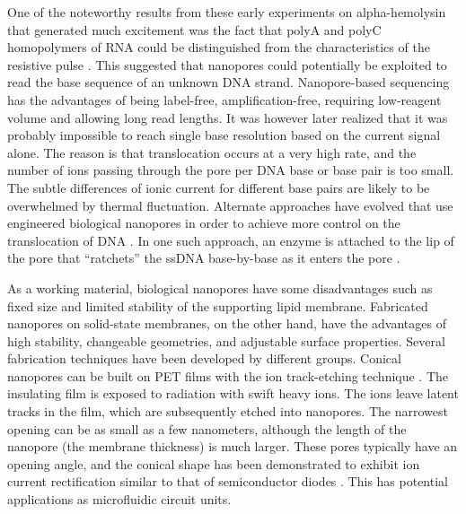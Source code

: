 One of the noteworthy results from these early experiments on alpha-hemolysin that generated much excitement was the fact that polyA and polyC homopolymers of RNA could be distinguished from the characteristics of the resistive pulse \cite{Akeson1999,Meller2000}. This suggested that nanopores could potentially be exploited to read the base sequence of an unknown DNA strand. Nanopore-based sequencing has the advantages of being label-free, amplification-free, requiring low-reagent volume and allowing long read lengths. It was however later realized that it was probably impossible to reach single base resolution based on the current signal alone. The reason is that translocation occurs at a very high rate, and the number of ions passing through the pore per DNA base or base pair is too small. The subtle differences of ionic current for different base pairs are likely to be overwhelmed by thermal fluctuation. Alternate approaches have evolved that use 
 engineered biological nanopores in order to achieve more control on the translocation of DNA \cite{BayleyBook,gu1999stochastic,movileanu2000detecting,howorka2001sequence,benner2007sequence,cockroft2008single,lieberman2010processive}. In one such approach, an enzyme is attached to the lip of the pore that ``ratchets'' the ssDNA base-by-base as it enters the pore \cite{cockroft2008single}.

As a working material, biological nanopores have some disadvantages such as fixed size and  limited stability of the supporting lipid membrane. Fabricated nanopores on solid-state membranes, on the other hand, have the advantages of high stability, changeable geometries, and adjustable surface properties. Several fabrication techniques have been developed by different groups. Conical nanopores can be built on PET films with the ion track-etching technique \cite{siwy2002fabrication}. The insulating film is exposed to radiation with swift heavy ions. The ions leave latent tracks in the film, which are subsequently etched into nanopores. The narrowest opening can be as small as a few nanometers, although the length of the nanopore  (the membrane thickness) is much larger. These pores typically have an opening angle, and the conical shape 
has been demonstrated to exhibit ion current rectification similar to that of semiconductor 
diodes \cite{Siwy2004,siwy2006,Vlassiouk2007,Vlassiouk2008}. This has potential applications as microfluidic circuit units.

